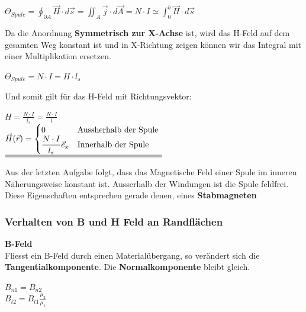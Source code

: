 \begin{center}

	$\displaystyle \Theta_{Spule} = \oint_{\partial A} \vec{H} \cdot d\vec{s} = \iint_{A} \vec{j} \cdot d\vec{A} = N \cdot I \simeq \int_0^b \vec{H} \cdot d\vec{s}$

	\end{center}
	Da die Anordnung \textbf{Symmetrisch zur X-Achse} ist, wird das H-Feld auf dem gesamten Weg konstant ist und in X-Richtung zeigen können wir das Integral mit einer Multiplikation ersetzen.
	\begin{center}

	$ \displaystyle \Theta_{Spule} = N \cdot I = H \cdot l_{s}$

	\end{center}
	Und somit gilt für das H-Feld mit Richtungsvektor:
	\begin{center}

	$\displaystyle H = \frac{N\cdot I}{l_{s}}  = \frac{N\cdot I}{l}$ \\ \fspace
 	$\displaystyle
		\underline{\underline{   \vec{H}(\vec{r}) =
		\begin{cases}
0 & $Aussherhalb der Spule $\\
\displaystyle \frac{N\cdot I}{l_{s}} \vec{e}_x & $Innerhalb der Spule $\\
\end{cases}}}$

	\end{center}
	\iend


	Aus der letzten Aufgabe folgt, dass das Magnetische Feld einer Spule im inneren Näherungsweise konstant ist. Ausserhalb der Windungen ist die Spule feldfrei. \\
	Diese Eigenschaften entsprechen gerade denen, eines \textbf{Stabmagneten}


\subsubsection{Verhalten von B und H Feld an Randflächen}
\fix \fix
\textbf{B-Feld} \\
Fliesst ein B-Feld durch einen Materialübergang, so verändert sich die \textbf{Tangentialkomponente}. Die \textbf{Normalkomponente} bleibt gleich.
\begin{center}
\end{center}
\formulaBegin
$ \displaystyle B_{n1} = B_{n2}$ \\ $\displaystyle B_{t2} = B_{t1} \frac{\mu_2}{\mu_1} $
\formulaEnd

